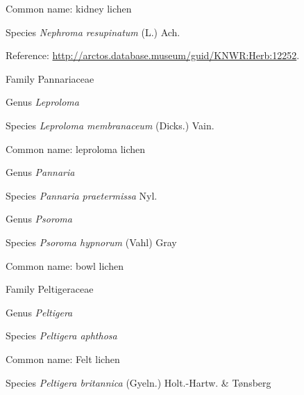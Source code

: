 \documentclass[9pt, article]{memoir}
\begin{document}
\begin{multicols}{2}
Common name: kidney lichen

\vspace{6pt}\noindent\hspace{36pt}Species \textit{Nephroma resupinatum} (L.) Ach.


Reference: 
\url{http://arctos.database.museum/guid/KNWR:Herb:12252}.

\vspace{6pt}\noindent\hspace{24pt}Family Pannariaceae


\vspace{6pt}\noindent\hspace{30pt}Genus \textit{Leproloma}


\vspace{6pt}\noindent\hspace{36pt}Species \textit{Leproloma membranaceum} (Dicks.) Vain.


Common name: leproloma lichen

\vspace{6pt}\noindent\hspace{30pt}Genus \textit{Pannaria}


\vspace{6pt}\noindent\hspace{36pt}Species \textit{Pannaria praetermissa} Nyl.


\vspace{6pt}\noindent\hspace{30pt}Genus \textit{Psoroma}


\vspace{6pt}\noindent\hspace{36pt}Species \textit{Psoroma hypnorum} (Vahl) Gray


Common name: bowl lichen

\vspace{6pt}\noindent\hspace{24pt}Family Peltigeraceae


\vspace{6pt}\noindent\hspace{30pt}Genus \textit{Peltigera}


\vspace{6pt}\noindent\hspace{36pt}Species \textit{Peltigera aphthosa}


Common name: Felt lichen

\vspace{6pt}\noindent\hspace{36pt}Species \textit{Peltigera britannica} (Gyeln.) Holt.-Hartw. \& Tønsberg



\end{multicols}
\end{document}
